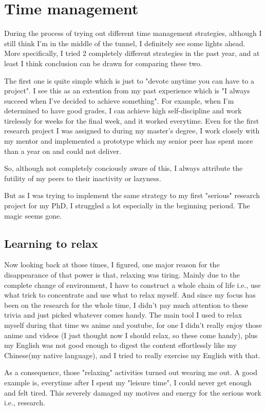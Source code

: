 \section{Time management}
\label{sec:time}
During the process of trying out different time management strategies, although I still think I'm in the middle of the tunnel, I definitely see some lights ahead.
More specifically, I tried 2 completely different strategies in the past year, and at least I think conclusion can be drawn for comparing these two.

The first one is quite simple which is just to "devote anytime you can have to a project".
I see this as an extention from my past experience which is "I always succeed when I've decided to achieve something".
For example, when I'm determined to have good grades, I can achieve high self-discipline and work tirelessly for weeks for the final week, and it worked everytime.
Even for the first research project I was assigned to during my master's degree, I work closely with my mentor and implemented a prototype 
which my senior peer has spent more than a year on and could not deliver.

So, although not completely conciously aware of this, I always attribute the futility of my peers to their inactivity or lazyness.

But as I was trying to implement the same strategy to my first "serious" research project for my PhD, I struggled a lot especially in the beginning perioud.
The magic seems gone.
\subsection{Learning to relax}
Now looking back at those times, I figured, one major reason for the disappearance of that power is that, relaxing was tiring.
Mainly due to the complete change of environment, I have to construct a whole chain of life i.e., use what trick to concentrate and use what to relax myself.
And since my focus has been on the research for the whole time, I didn't pay much attention to these trivia and just picked whatever comes handy.
The main tool I used to relax myself during that time ws anime and youtube, for one I didn't really enjoy those anime and videos
(I just thought now I should relax, so these come handy), plus my English was not good enough to digest the content effortlessly 
like my Chinese(my native language), and I tried to really exercise my English with that.

As a consequence, those "relaxing" activities turned out wearing me out. A good example is, everytime after I spent my "leisure time", I could never get enough and felt tired.
This severely damaged my motives and energy for the serious work i.e., research.

